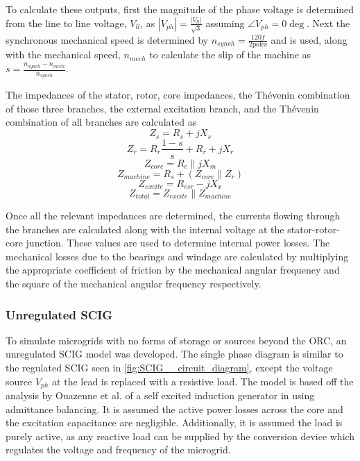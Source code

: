 To calculate these outputs, first the magnitude of the phase voltage is determined from the line to line voltage, $V_{ll}$, as $ \left|V_{ph}\right| = \frac{\left|V_{ll}\right|}{\sqrt{3}} $ assuming $ \angle V_{ph} = 0\deg $. Next the synchronous mechanical speed is determined by $ n_{synch} = \frac{120f}{2\text{poles}} $ and is used, along with the mechanical speed, $n_{mech}$ to calculate the slip of the machine as $ s = \frac{n_{synch} - n_{mech}}{n_{synch}} $.

The impedances of the stator, rotor, core impedances, the Th\'evenin combination of those three branches, the external excitation branch, and the Th\'evenin combination of all branches are calculated as
\begin{equation*}
Z_s = R_s + jX_s
\end{equation*}
\begin{equation*}
Z_r = R_r\frac{1-s}{s} + R_r + jX_r
\end{equation*}
\begin{equation*}
Z_{core} = R_c \parallel jX_m
\end{equation*}
\begin{equation*}
Z_{machine} = R_s + \left(Z_{core} \parallel Z_r\right)
\end{equation*}
\begin{equation*}
Z_{excite} = R_{esr} - jX_x
\end{equation*}
\begin{equation*}
Z_{total} = Z_{excite} \parallel Z_{machine}
\end{equation*}

Once all the relevant impedances are determined, the currents flowing through the branches are calculated along with the internal voltage at the stator-rotor-core junction. These values are used to determine internal power losses. The mechanical losses due to the bearings and windage are calculated by multiplying the appropriate coefficient of friction by the mechanical angular frequency  and the square of the mechanical angular frequency respectively. 

\subsubsection{Unregulated SCIG}
To simulate microgrids with no forms of storage or sources beyond the ORC, an unregulated SCIG model was developed. The single phase diagram is similar to the regulated SCIG seen in \autoref{fig:SCIG__circuit_diagram}, except the voltage source $V_{ph}$ at the lead is replaced with a resistive load. The model is based off the analysis by Ouazenne et al. of a self excited induction generator in \cite{Ouazenne1983} using admittance balancing. It is assumed the active power losses across the core and the excitation capacitance are negligible. Additionally, it is assumed the load is purely active, as any reactive load can be supplied by the conversion device which regulates the voltage and frequency of the microgrid.


